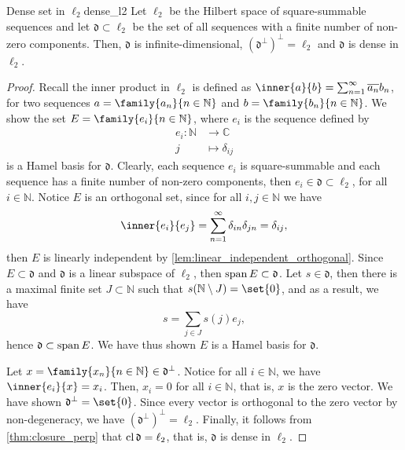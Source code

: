 \begin{example}{Dense set in \(\ell_2\)}{dense_l2}
    Let \(\ell_2\) be the Hilbert space of square-summable sequences and let \(\mathfrak{d} \subset \ell_2\) be the set of all sequences with a finite number of non-zero components. Then, \(\mathfrak{d}\) is infinite-dimensional, \((\mathfrak{d}^\perp)^\perp = \ell_2\) and \(\mathfrak{d}\) is dense in \(\ell_2\).
\end{example}
\begin{proof}
    Recall the inner product in \(\ell_2\) is defined as \(\inner{a}{b} = \sum_{n = 1}^\infty \conj{a_n} b_n\), for two sequences \(a = \family{a_n}{n\in \mathbb{N}}\) and \(b = \family{b_n}{n \in \mathbb{N}}\). We show the set \(E = \family{e_i}{n\in \mathbb{N}}\), where \(e_i\) is the sequence defined by
    \begin{align*}
        e_i : \mathbb{N} &\to \mathbb{C}\\
                       j &\mapsto \delta_{ij}
    \end{align*}
    is a Hamel basis for \(\mathfrak{d}\). Clearly, each sequence \(e_i\) is square-summable and each sequence has a finite number of non-zero components, then \(e_i \in \mathfrak{d} \subset \ell_2\), for all \(i \in \mathbb{N}\). Notice \(E\) is an orthogonal set, since for all \(i,j \in \mathbb{N}\) we have
    \begin{equation*}
        \inner{e_i}{e_j} = \sum_{n = 1}^\infty \delta_{in} \delta_{jn} = \delta_{ij},
    \end{equation*}
    then \(E\) is linearly independent by \cref{lem:linear_independent_orthogonal}. Since \(E \subset \mathfrak{d}\) and \(\mathfrak{d}\) is a linear subspace of \(\ell_2\), then \(\operatorname{span}{E} \subset \mathfrak{d}\). Let \(s \in \mathfrak{d}\), then there is a maximal finite set \(J \subset \mathbb{N}\) such that \(s(\mathbb{N} \setminus J) = \set{0}\), and as a result, we have
    \begin{equation*}
        s = \sum_{j \in J} s(j) e_j,
    \end{equation*}
    hence \(\mathfrak{d} \subset \operatorname{span}{E}\). We have thus shown \(E\) is a Hamel basis for \(\mathfrak{d}\).

    Let \(x = \family{x_n}{n\in \mathbb{N}} \in \mathfrak{d}^\perp\). Notice for all \(i \in \mathbb{N}\), we have \(\inner{e_i}{x} = x_i\). Then, \(x_i = 0\) for all \(i \in \mathbb{N}\), that is, \(x\) is the zero vector. We have shown \(\mathfrak{d}^\perp = \set{0}\). Since every vector is orthogonal to the zero vector by non-degeneracy, we have \((\mathfrak{d}^\perp)^\perp = \ell_2\). Finally, it follows from \cref{thm:closure_perp} that \(\operatorname{cl}\mathfrak{d} = \ell_2\), that is, \(\mathfrak{d}\) is dense in \(\ell_2\).
\end{proof}


